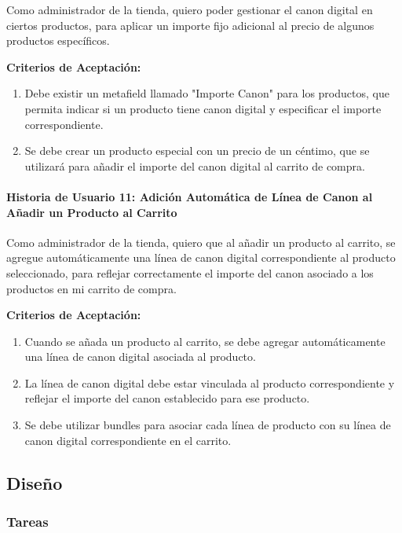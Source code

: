 \documentclass[12pt]{article}
\newcommand{\subsubsubsection}[1]{\paragraph{#1}}
\begin{document}
Como administrador de la tienda,
quiero poder gestionar el canon digital en ciertos productos,
para aplicar un importe fijo adicional al precio de algunos productos específicos.

\vspace{0.5cm}
\textbf{Criterios de Aceptación:}
\begin{enumerate}[label=\arabic*.]
    \item Debe existir un metafield llamado "Importe Canon" para los productos, que permita indicar si un producto tiene canon digital y especificar el importe correspondiente.
    \item Se debe crear un producto especial con un precio de un céntimo, que se utilizará para añadir el importe del canon digital al carrito de compra.
\end{enumerate}


\subsubsubsection{Historia de Usuario 11: Adición Automática de Línea de Canon al Añadir un Producto al Carrito}\label{sec:historia11}

Como administrador de la tienda,
quiero que al añadir un producto al carrito, se agregue automáticamente una línea de canon digital correspondiente al producto seleccionado,
para reflejar correctamente el importe del canon asociado a los productos en mi carrito de compra.

\vspace{0.5cm}
\textbf{Criterios de Aceptación:}
\begin{enumerate}[label=\arabic*.]
    \item Cuando se añada un producto al carrito, se debe agregar automáticamente una línea de canon digital asociada al producto.
    \item La línea de canon digital debe estar vinculada al producto correspondiente y reflejar el importe del canon establecido para ese producto.
    \item Se debe utilizar bundles para asociar cada línea de producto con su línea de canon digital correspondiente en el carrito.
\end{enumerate}


\subsection{Diseño}

\subsubsection{Tareas}
\end{document}
